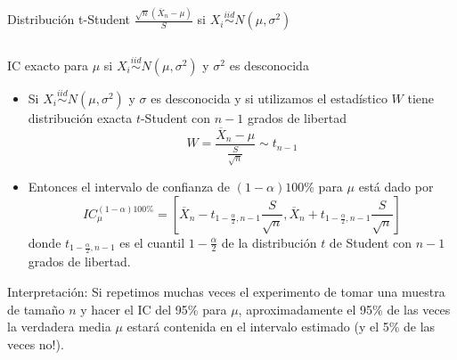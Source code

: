 \documentclass{beamer}
\theoremstyle{definition}
\begin{document}
\begin{frame}{\color{rosee}Distribución t-Student  $\frac{\sqrt{n}(\overline{X}_{n} - \mu)}{S}$ si $X_i\stackrel{iid}{\sim}N(\mu,\sigma^2)$}
\begin{columns}
\begin{column}[t]{0.48\textwidth}
\begin{center}
    \end{center}
  
    \end{column}
  \end{columns}
\end{frame}


 

\begin{frame}{\color{rosee}IC exacto para $\mu$ si $X_i\stackrel{iid}{\sim}N(\mu,\sigma^2)$ y $\sigma^2$ es desconocida} \small
  \begin{itemize}
  \item Si $X_i\stackrel{iid}{\sim}N(\mu, \sigma^2)$ y 
    $\sigma$ es desconocida y si utilizamos el estad\'istico $W$ tiene distribución exacta $t$-Student con $n-1$ grados de libertad
    \[W=\frac{\overline{X}_{n} - \mu}{\frac{S}{\sqrt{n}}}\sim t_{n-1}\]
    \item Entonces el intervalo de confianza
      de $(1-\alpha)100\%$ para $\mu$ est\'a dado por
      \[IC_{\mu}^{(1-\alpha)100\%}=\left[\overline{X}_{n} - t_{1-\frac{\alpha}{2},n-1}\frac{S}{\sqrt{n}} , \overline{X}_{n}
        +t_{1-\frac{\alpha}{2},n-1}\frac{S}{\sqrt{n}}\right]\] donde
      $t_{1-\frac{\alpha}{2},n-1}$ es el cuantil $1-\frac{\alpha}{2}$ de la distribución $t$ de Student con $n-1$ grados de libertad.
  \end{itemize}
    \begin{block}{Interpretaci\'on:}
    Si repetimos muchas veces el experimento de tomar una muestra de
    tama\~no $n$ y hacer el IC del 95\% para $\mu$, aproximadamente el
    95\% de las veces la verdadera media $\mu$ estará contenida en el intervalo estimado (y el 5\% de las veces no!).
  \end{block}
\end{frame}
\end{document}
